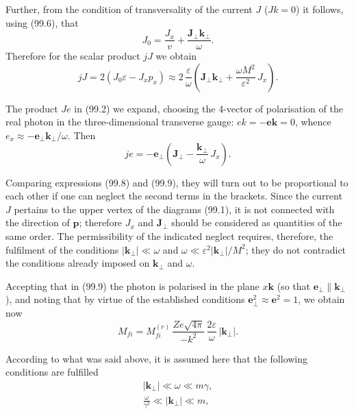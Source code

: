 Further, from the condition of transversality of the current $J$ ($Jk = 0$) it follows, using (99.6), that
\[
J_0 = \frac{J_x}{v} + \frac{\mathbf{J}_\perp\mathbf{k}_\perp}{\omega}.
\]
Therefore for the scalar product $jJ$ we obtain
\begin{equation}
jJ = 2(J_0\varepsilon - J_x p_x) \approx 2\,\frac{\varepsilon}{\omega}\!\left(\mathbf{J}_\perp\mathbf{k}_\perp + \frac{\omega M^2}{\varepsilon^2}\,J_x\right).
\label{eq:99.8}
\end{equation}

The product $Je$ in (99.2) we expand, choosing the 4-vector of polarisation of the real photon in the three-dimensional transverse gauge: $ek = -\mathbf{e}\mathbf{k} = 0$, whence $e_x \approx -\mathbf{e}_\perp\mathbf{k}_\perp/\omega$. Then
\begin{equation}
je = -\mathbf{e}_\perp\!\left(\mathbf{J}_\perp - \frac{\mathbf{k}_\perp}{\omega}\,J_x\right).
\label{eq:99.9}
\end{equation}

Comparing expressions (99.8) and (99.9), they will turn out to be proportional to each other if one can neglect the second terms in the brackets. Since the current $J$ pertains to the upper vertex of the diagrams (99.1), it is not connected with the direction of $\mathbf{p}$; therefore $J_x$ and $\mathbf{J}_\perp$ should be considered as quantities of the same order. The permissibility of the indicated neglect requires, therefore, the fulfilment of the conditions $|\mathbf{k}_\perp| \ll \omega$ and $\omega \ll \varepsilon^2|\mathbf{k}_\perp|/M^2$; they do not contradict the conditions already imposed on $\mathbf{k}_\perp$ and $\omega$.

Accepting that in (99.9) the photon is polarised in the plane $x\mathbf{k}$ (so that $\mathbf{e}_\perp \parallel \mathbf{k}_\perp$), and noting that by virtue of the established conditions $\mathbf{e}_\perp^2 \approx \mathbf{e}^2 = 1$, we obtain now
\begin{equation}
M_{fi} = M_{fi}^{(r)}\,\frac{Ze\sqrt{4\pi}}{-k^2}\,\frac{2\varepsilon}{\omega}\,|\mathbf{k}_\perp|.
\label{eq:99.10}
\end{equation}

According to what was said above, it is assumed here that the following conditions are fulfilled
\begin{gather}
|\mathbf{k}_\perp| \ll \omega \ll m\gamma, \label{eq:99.11} \\
\frac{\omega}{\gamma^2} \ll |\mathbf{k}_\perp| \ll m, \label{eq:99.12}
\end{gather}

